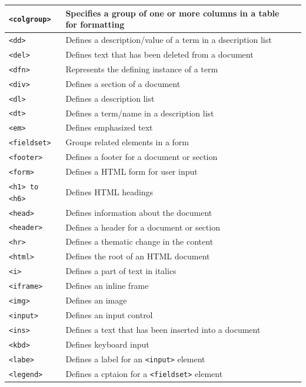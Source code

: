 \documentclass[11pt, letterpaper]{article}
\begin{document}
\begin{longtable}{l p{10cm} l}
			\texttt{<colgroup>} & Specifies a group of one or more columns in a table for formatting\\\midrule
			\texttt{<dd>} & Defines a description/value of a term in a dsecription list\\\midrule
			\texttt{<del>} & Defines text that has been deleted from a document\\\midrule
			\texttt{<dfn>} & Represents the defining instance of a term \\\midrule
			\texttt{<div>} & Defines a section of a document\\\midrule
			\texttt{<dl>} & Defines a description list\\\midrule
			\texttt{<dt>} & Defines a term/name in a description list\\\midrule
			\texttt{<em>} & Defines emphasized text \\\midrule
			\texttt{<fieldset>} & Groups related elements in a form\\\midrule
			\texttt{<footer>} & Defines a footer for a document or section\\\midrule
			\texttt{<form>} & Defines a HTML form for user input\\\midrule
			\texttt{<h1> to <h6>} & Defines HTML headings\\\midrule
			\texttt{<head>} & Defines information about the document\\\midrule
			\texttt{<header>} & Defines a header for a document or section\\\midrule
			\texttt{<hr>} & Defines a thematic change in the content\\\midrule
			\texttt{<html>} & Defines the root of an HTML document\\\midrule
			\texttt{<i>} & Defines a part of text in italics\\\midrule
			\texttt{<iframe>} & Defines an inline frame\\\midrule
			\texttt{<img>} & Defines an image\\\midrule
			\texttt{<input>} & Defines an input control\\\midrule
			\texttt{<ins>} & Defines a text that has been inserted into a document\\\midrule
			\texttt{<kbd>} & Defines keyboard input\\\midrule
			\texttt{<labe>} & Defines a label for an \texttt{<input>} element\\\midrule
			\texttt{<legend>} & Defines a cptaion for a \texttt{<fieldset>} element\\\midrule

\end{longtable}
\end{document}
